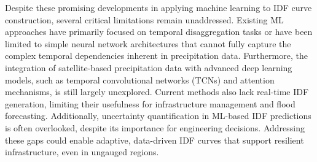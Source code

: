 Despite these promising developments in applying machine learning to IDF curve construction, several critical limitations remain unaddressed. Existing ML approaches have primarily focused on temporal disaggregation tasks or have been limited to simple neural network architectures that cannot fully capture the complex temporal dependencies inherent in precipitation data. Furthermore, the integration of satellite-based precipitation data with advanced deep learning models, such as temporal convolutional networks (TCNs) and attention mechanisms, is still largely unexplored. Current methods also lack real-time IDF generation, limiting their usefulness for infrastructure management and flood forecasting. Additionally, uncertainty quantification in ML-based IDF predictions is often overlooked, despite its importance for engineering decisions. Addressing these gaps could enable adaptive, data-driven IDF curves that support resilient infrastructure, even in ungauged regions.